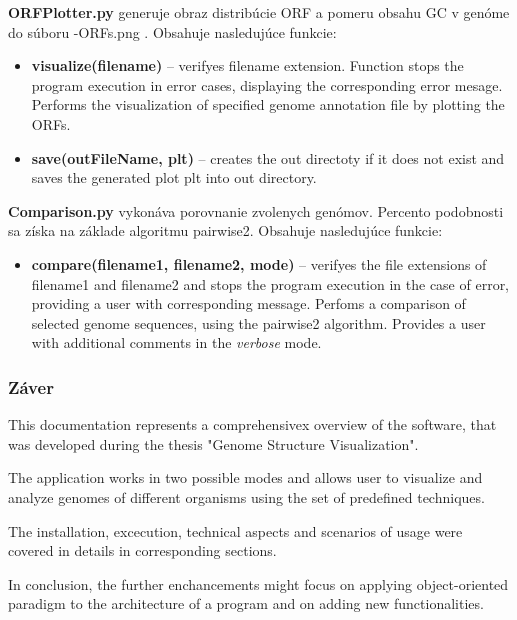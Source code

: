 \textbf{\selectfont ORFPlotter.py} generuje obraz distribúcie ORF a pomeru obsahu GC v genóme do súboru {\selectfont -ORFs.png} .
Obsahuje nasledujúce funkcie:
\begin{itemize}
  \item \textbf{\selectfont visualize(filename)} -- verifyes {\selectfont filename} extension. Function stops the program execution in error cases, displaying the corresponding error mesage. Performs the visualization of specified genome annotation file by plotting the ORFs.
  \item \textbf{\selectfont save(outFileName, plt)} -- creates the {\selectfont out} directoty if it does not exist and saves the generated plot {\selectfont plt} into {\selectfont out} directory.
\end{itemize}

\textbf{\selectfont Comparison.py} vykonáva porovnanie zvolenych genómov. Percento podobnosti sa získa na základe algoritmu pairwise2.
Obsahuje nasledujúce funkcie:
\begin{itemize}
  \item \textbf{\selectfont compare(filename1, filename2, mode)} -- verifyes the file extensions of {\selectfont filename1} and {\selectfont filename2} and stops the program execution in the case of error, providing a user with corresponding message. Perfoms a comparison of selected genome sequences, using the pairwise2 algorithm. Provides a user with additional comments in the \textit{verbose} mode. 
\end{itemize}

\subsubsection{\Large{Záver}}
This documentation represents a comprehensivex overview of the software, that was developed during the thesis "Genome Structure Visualization".

The application works in two possible modes and allows user to visualize and analyze genomes of different organisms using the set of predefined techniques.

The installation, excecution, technical aspects and scenarios of usage were covered in details in corresponding sections.

In conclusion, the further enchancements might focus on applying object-oriented paradigm to the architecture of a program and on adding new functionalities.

